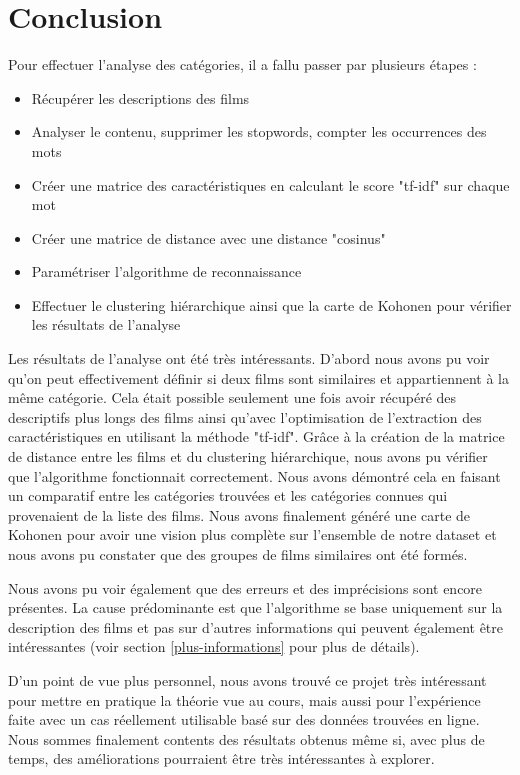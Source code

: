 \chapter{Conclusion}
\noindent Pour effectuer l'analyse des catégories, il a fallu passer par plusieurs étapes : \\

\begin{itemize}
\item Récupérer les descriptions des films
\item Analyser le contenu, supprimer les stopwords, compter les occurrences des mots
\item Créer une matrice des caractéristiques en calculant le score "tf-idf" sur chaque mot
\item Créer une matrice de distance avec une distance "cosinus"
\item Paramétriser l'algorithme de reconnaissance
\item Effectuer le clustering hiérarchique ainsi que la carte de Kohonen pour vérifier les résultats de l'analyse\\
\end{itemize}

Les résultats de l'analyse ont été très intéressants. D'abord nous avons pu voir qu’on peut effectivement définir si deux films sont similaires et appartiennent à la même catégorie. Cela était possible seulement une fois avoir récupéré des descriptifs plus longs des films ainsi qu'avec l'optimisation de l'extraction des caractéristiques en utilisant la méthode "tf-idf". Grâce à la création de la matrice de distance entre les films et du clustering hiérarchique, nous avons pu vérifier que l'algorithme fonctionnait correctement. Nous avons démontré cela en faisant un comparatif entre les catégories trouvées et les catégories connues qui provenaient de la liste des films. Nous avons finalement généré une carte de Kohonen pour avoir une vision plus complète sur l'ensemble de notre dataset et nous avons pu constater que des groupes de films similaires ont été formés. 
 
Nous avons pu voir également que des erreurs et des imprécisions sont encore présentes. La cause prédominante est que l'algorithme se base uniquement sur la description des films et pas sur d'autres informations qui peuvent également être intéressantes (voir section \ref{plus-informations} pour plus de détails). 
 
D'un point de vue plus personnel, nous avons trouvé ce projet très intéressant pour mettre en pratique la théorie vue au cours, mais aussi pour l'expérience faite avec un cas réellement utilisable basé sur des données trouvées en ligne. Nous sommes finalement contents des résultats obtenus même si, avec plus de temps, des améliorations pourraient être très intéressantes à explorer.